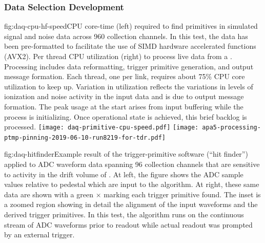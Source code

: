 \subsubsection{Data Selection Development}

\begin{dunefigure}{fig:daq-cpu-hf-speed}{CPU core-time (left) required to find primitives in simulated signal and noise data across 960 collection channels.
    In this test, the data has been pre-formatted to facilitate the use of SIMD hardware accelerated functions (AVX2). 
    Per thread CPU utilization (right) to process live data from a  .
    Processing includes data reformatting, trigger primitive generation, and output message formation.
    Each thread, one per  link, requires about 75\% CPU core utilization to keep up.
    Variation in utilization reflects the variations in levels of ionization and noise activity in the input data and is due to output message formation.
    The peak usage at the start arises from input buffering while the process is initializing. 
    Once operational state is achieved, this brief backlog is processed.}
  \texttt{[image: daq-primitive-cpu-speed.pdf]}%
 \texttt{[image: apa5-processing-ptmp-pinning-2019-06-10-run8219-for-tdr.pdf]}
\end{dunefigure}

\begin{dunefigure}{fig:daq-hitfinder}{Example result of the trigger-primitive software (``hit finder'') applied to ADC waveform data spanning 96 collection channels that are sensitive to activity in the drift volume of . 
    At left, the figure shows the ADC sample values relative to pedestal which are input to the algorithm. 
    At right, these same data are shown with a green $\times$ marking each trigger primitive found. 
    The inset is a zoomed region showing in detail the alignment of the input waveforms and the derived trigger primitives.
    In this test, the algorithm runs on the continuous stream of ADC waveforms prior to readout while actual readout was prompted by an external trigger.}
\end{dunefigure}

